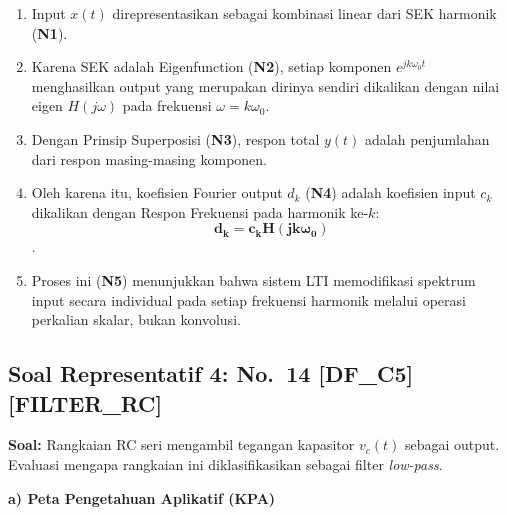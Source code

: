 \documentclass[
  letterpaper,
  DIV=11,
  numbers=noendperiod]{scrreprt}
\providecommand{\tightlist}{%
  \setlength{\itemsep}{0pt}\setlength{\parskip}{0pt}}
\begin{document}
\begin{enumerate}
\def\labelenumi{\arabic{enumi}.}
\tightlist
\item
  Input \(x(t)\) direpresentasikan sebagai kombinasi linear dari SEK
  harmonik (\textbf{N1}).
\item
  Karena SEK adalah Eigenfunction (\textbf{N2}), setiap komponen
  \(e^{jk\omega_0 t}\) menghasilkan output yang merupakan dirinya
  sendiri dikalikan dengan nilai eigen \(H(j\omega)\) pada frekuensi
  \(\omega = k\omega_0\).
\item
  Dengan Prinsip Superposisi (\textbf{N3}), respon total \(y(t)\) adalah
  penjumlahan dari respon masing-masing komponen.
\item
  Oleh karena itu, koefisien Fourier output \(d_k\) (\textbf{N4}) adalah
  koefisien input \(c_k\) dikalikan dengan Respon Frekuensi pada
  harmonik ke-\(k\): \[\mathbf{d_k = c_k H(jk\omega_0)}\].
\item
  Proses ini (\textbf{N5}) menunjukkan bahwa sistem LTI memodifikasi
  spektrum input secara individual pada setiap frekuensi harmonik
  melalui operasi perkalian skalar, bukan konvolusi.
\end{enumerate}

\subsection{Soal Representatif 4: No.~14
{[}DF\_C5{]}{[}FILTER\_RC{]}}\label{soal-representatif-4-no.-14-df_c5filter_rc}

\textbf{Soal:} Rangkaian RC seri mengambil tegangan kapasitor \(v_c(t)\)
sebagai output. Evaluasi mengapa rangkaian ini diklasifikasikan sebagai
filter \emph{low-pass}.

\textbf{a) Peta Pengetahuan Aplikatif (KPA)}
\end{document}
